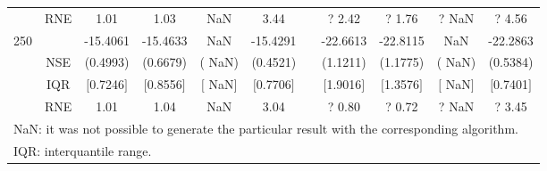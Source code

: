 {{\begin{longtable}{ccccccccccc}
  & RNE &   1.01 &   1.03 &    NaN &   3.44 &  &?   2.42 & ?   1.76 &  ?    NaN & ?   4.56   \\ [1ex] 
250 & & -15.4061 & -15.4633 &    NaN & -15.4291 & & -22.6613 & -22.8115 &    NaN & -22.2863  \\ 
  & NSE & (0.4993) & (0.6679) & (   NaN) & (0.4521) & & (1.1211) & (1.1775) & (   NaN) & (0.5384)   \\ 
 & IQR & $[$0.7246$]$ & $[$0.8556$]$ & $[$   NaN$]$ & $[$0.7706$]$ & & $[$1.9016$]$ & $[$1.3576$]$  &$[$   NaN$]$ & $[$0.7401$]$  \\  
  & RNE &   1.01 &   1.04 &    NaN &   3.04 &  &?   0.80 & ?   0.72 &  ?    NaN & ?   3.45   \\ [1ex] 
\hline 
  \multicolumn{11}{l}{\footnotesize{NaN: it was not possible to generate the particular result with the corresponding algorithm.}} \\ 
  \multicolumn{11}{l}{\footnotesize{IQR: interquantile range.}} \\ 
\end{longtable} 
} 
} 
